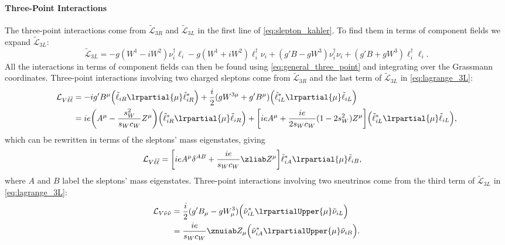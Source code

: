 \paragraph{Three-Point Interactions}\label{sec:three_point}
The three-point interactions come from $\tilde{\mathcal L}_{3R}$ and $\tilde{\mathcal L}_{3L}$ in the first line of \cref{eq:slepton_kahler}. To find them in terms of component fields we expand $\tilde{\mathcal L}_{3L}$:
\begin{equation}
    \tilde{\mathcal{L}}_{3L} =
    -g (W^1-iW^2)\nu_i^\dagger\ell_i - g(W^1+iW^2)\ell_i^\dagger\nu_i
    + (g'B-gW^3)\nu_i^\dagger \nu_i
    + (g'B+gW^3)\ell_i^\dagger\ell_i.
    \label{eq:lagrange_3L}
\end{equation}
All the interactions in terms of component fields can then be found using \cref{eq:general_three_point} and integrating over the Grassmann coordinates.
Three-point interactions involving two charged sleptons come from $\tilde{\mathcal{L}}_{3R}$ and the last term of $\tilde{\mathcal{L}}_{3L}$ in \cref{eq:lagrange_3L}:
\begin{align*}
    \mathcal{L}_{V\tilde\ell\tilde\ell} &= -ig' B^\mu \Bigl( \tilde{\ell}_{iR} \lrpartial{\mu} \tilde{\ell}_{iR}^* \Bigr)
    +\frac{i}{2} (gW^{3\mu}+g'B^\mu) \Bigl( \tilde{\ell}_{iL}^* \lrpartial{\mu} \tilde{\ell}_{iL} \Bigr)
    \\
    &= ie \biggl( A^\mu - \frac{s_W^2}{s_Wc_W}Z^\mu \biggr) \Bigl( \tilde{\ell}_{iR}^* \lrpartial{\mu} \tilde{\ell}_{iR} \Bigr)
    + \biggl[ ie A^\mu + \frac{ie}{2s_Wc_W} (1-2s_W^2) Z^\mu \biggr] \Bigl( \tilde{\ell}_{iL}^* \lrpartial{\mu}  \tilde{\ell}_{iL} \Bigr),
\end{align*}
which can be rewritten in terms of the sleptons' mass eigenstates, giving
\begin{align}
    \mathcal{L}_{V\tilde\ell\tilde\ell}
    &= \biggl[ ieA^\mu \delta^{AB} + \frac{ie}{s_Wc_W} \zliab Z^\mu \biggr] \tilde{\ell}_{iA}^* \lrpartial{\mu} \tilde{\ell}_{iB},
    \label{eq:L_Vll}
\end{align}
where $A$ and $B$ label the sleptons' mass eigenstates.
Three-point interactions involving two sneutrinos come from the third term of $\tilde{\mathcal{L}}_{3L}$ in \cref{eq:lagrange_3L}:
\begin{align}
    \mathcal{L}_{V\tilde\nu\tilde\nu} &= \frac{i}{2} (g'B_\mu-gW^3_\mu) \Bigl( \tilde\nu_{iL}^* \lrpartialUpper{\mu} \tilde\nu_{iL} \Bigr)
    \nonumber
    \\
    &= \frac{ie}{s_Wc_W} \znuiab Z_\mu \Bigl( \tilde\nu_{iA}^* \lrpartialUpper{\mu} \tilde\nu_{iB} \Bigr).
    \label{eq:L_Vnunu}
\end{align}
